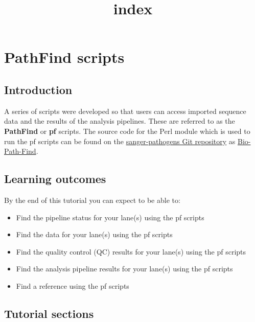 \documentclass[11pt]{article}
\title{index}
\providecommand{\tightlist}{%
      \setlength{\itemsep}{0pt}\setlength{\parskip}{0pt}}
\begin{document}
    \hypertarget{pathfind-scripts}{%
\section{PathFind scripts}\label{pathfind-scripts}}

    \hypertarget{introduction}{%
\subsection{Introduction}\label{introduction}}

A series of scripts were developed so that users can access imported
sequence data and the results of the analysis pipelines. These are
referred to as the \textbf{PathFind} or \textbf{pf} scripts. The source
code for the Perl module which is used to run the pf scripts can be
found on the \href{https://github.com/sanger-pathogens}{sanger-pathogens
Git repository} as
\href{https://github.com/sanger-pathogens/Bio-Path-Find}{Bio-Path-Find}.

    \hypertarget{learning-outcomes}{%
\subsection{Learning outcomes}\label{learning-outcomes}}

By the end of this tutorial you can expect to be able to:

\begin{itemize}
\tightlist
\item
  Find the pipeline status for your lane(s) using the pf scripts
\item
  Find the data for your lane(s) using the pf scripts
\item
  Find the quality control (QC) results for your lane(s) using the pf
  scripts
\item
  Find the analysis pipeline results for your lane(s) using the pf
  scripts
\item
  Find a reference using the pf scripts
\end{itemize}

    \hypertarget{tutorial-sections}{%
\subsection{Tutorial sections}\label{tutorial-sections}}
\end{document}
